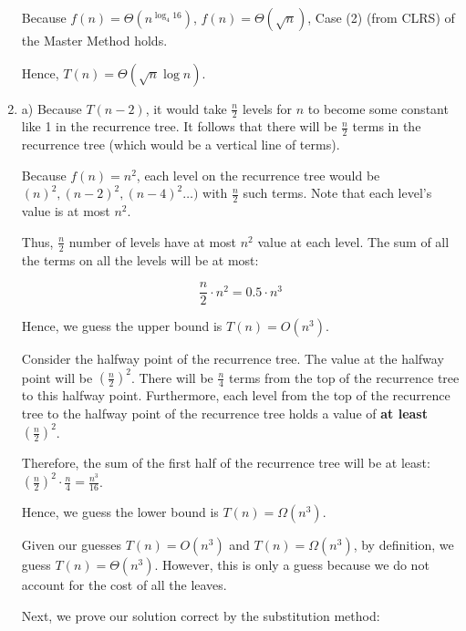 \documentclass[a4paper]{report}
\begin{document}
\begin{enumerate}
      Because $f(n) = \Theta(n^{\log_4 16})$, $f(n) = \Theta(\sqrt{n})$, Case (2) (from CLRS) of the Master Method holds. 

      Hence, $T(n) = \Theta(\sqrt{n} \log n)$. 

    \par
    \bigskip

    \item

      a) Because $T(n-2)$, it would take $\frac{n}{2}$ levels for $n$ to become some constant like 1 in the recurrence tree. 
      It follows that there will be $\frac{n}{2}$ terms in the recurrence tree (which would be a vertical line of terms). 

      Because $f(n) = n^2$, each level on the recurrence tree would be $(n)^2, (n-2)^2, (n-4)^2\dots)$ with $\frac{n}{2}$ such terms.
      Note that each level's value is at most $n^2$. 

      Thus, $\frac{n}{2}$ number of levels have at most $n^2$ value at each level. 
      The sum of all the terms on all the levels will be at most:

      $$\frac{n}{2} \cdot n^2 = 0.5 \cdot n^3$$

      Hence, we guess the upper bound is $T(n) = O(n^3)$. 

      Consider the halfway point of the recurrence tree. The value at the halfway point will be $(\frac{n}{2})^2$. There will be
      $\frac{n}{4}$ terms from the top of the recurrence tree to this halfway point. Furthermore, each level from the top of the
      recurrence tree to the halfway point of the recurrence tree holds a value of {\bf at least} $(\frac{n}{2})^2$.

      Therefore, the sum of the first half of the recurrence tree will be at least: $(\frac{n}{2})^2 \cdot \frac{n}{4} = \frac{n^{3}}{16}$.

      Hence, we guess the lower bound is $T(n) = \Omega(n^3)$.

      Given our guesses $T(n) = O(n^3)$ and $T(n) = \Omega(n^3)$, by definition, we guess $T(n) = \Theta(n^3)$.
      However, this is only a guess because we do not account for the cost of all the leaves. 
    

  
      Next, we prove our solution correct by the substitution method:


\end{enumerate}
\end{document}
